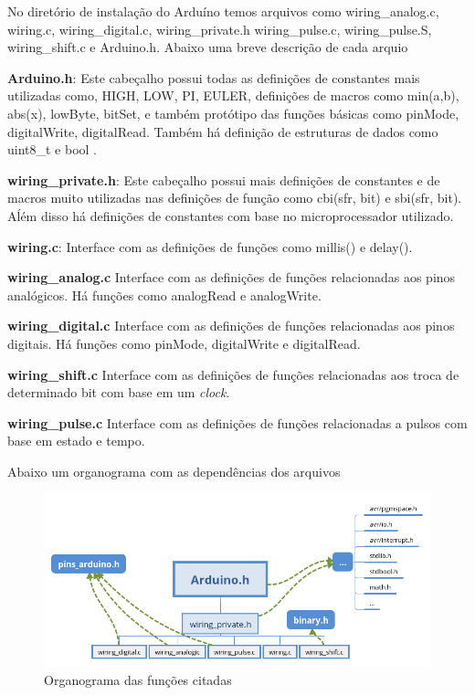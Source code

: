 No diretório de instalação do Arduíno temos arquivos como wiring\_analog.c, wiring.c, wiring\_digital.c, wiring\_private.h  wiring\_pulse.c, wiring\_pulse.S, wiring\_shift.c e Arduino.h. Abaixo uma breve descrição de cada arquio

\begin{alineas}
    \item \textbf{Arduino.h}: Este cabeçalho possui todas as definições de constantes mais utilizadas como, HIGH, LOW, PI, EULER, definições de macros como  min(a,b), abs(x), lowByte, bitSet, e também protótipo das funções básicas como pinMode, digitalWrite, digitalRead. Também há definição de estruturas de dados como uint8\_t e bool .
    \item \textbf{wiring\_private.h}: Este cabeçalho possui mais definições de constantes e de macros muito utilizadas nas definições de função como cbi(sfr, bit) e sbi(sfr, bit). Aĺém disso há definições de constantes com base no microprocessador utilizado.
    \item \textbf{wiring.c}: Interface com as definições de funções como millis() e delay(). 
    \item \textbf{wiring\_analog.c} Interface com as definições de funções relacionadas aos pinos analógicos. Há funções como analogRead e analogWrite. 
    \item \textbf{wiring\_digital.c} Interface com as definições de funções relacionadas aos pinos digitais. Há funções como pinMode, digitalWrite e digitalRead.
    \item \textbf{wiring\_shift.c} Interface com as definições de funções relacionadas aos troca de determinado bit com base em um \emph{clock}. 
    \item \textbf{wiring\_pulse.c} Interface com as definições de funções relacionadas a pulsos com base em estado e tempo. 
    
    Abaixo um organograma com as dependências dos arquivos
    
    \begin{figure}[htb]
    	\caption{\label{Organograma}Organograma das funções citadas}
    	\begin{center}
    	    \includegraphics[scale=0.5]{artigo/refs/org_head_arduino}
    	\end{center}
    \end{figure}
    
\end{alineas}

